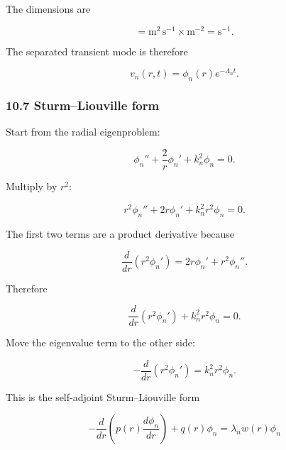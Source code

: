\documentclass[11pt,a4paper]{article}
\begin{document}
The dimensions are

\begin{equation}
[\Lambda_n]
=
\mathrm{m^2\,s^{-1}}
\times
\mathrm{m^{-2}}
=
\mathrm{s^{-1}}.
\tag{TRISO-ANA-306}
\label{eq:triso-ana-306}
\end{equation}

The separated transient mode is therefore

\begin{equation}
v_n(r,t)=\phi_n(r)e^{-\Lambda_nt}.
\tag{TRISO-ANA-307}
\label{eq:triso-ana-307}
\end{equation}

\subsubsection*{10.7 Sturm–Liouville form}

Start from the radial eigenproblem:

\begin{equation}
\phi_n''
+
\frac2r\phi_n'
+
k_n^2\phi_n
=
0.
\tag{TRISO-SL-200}
\label{eq:triso-sl-200}
\end{equation}

Multiply by $r^2$:

\begin{equation}
r^2\phi_n''
+
2r\phi_n'
+
k_n^2r^2\phi_n
=
0.
\tag{TRISO-SL-201}
\label{eq:triso-sl-201}
\end{equation}

The first two terms are a product derivative because

\begin{equation}
\frac{d}{dr}(r^2\phi_n')
=
2r\phi_n'
+
r^2\phi_n''.
\tag{TRISO-SL-202}
\label{eq:triso-sl-202}
\end{equation}

Therefore

\begin{equation}
\frac{d}{dr}(r^2\phi_n')
+
k_n^2r^2\phi_n
=
0.
\tag{TRISO-SL-203}
\label{eq:triso-sl-203}
\end{equation}

Move the eigenvalue term to the other side:

\begin{equation}
-\frac{d}{dr}(r^2\phi_n')
=
k_n^2r^2\phi_n.
\tag{TRISO-SL-204}
\label{eq:triso-sl-204}
\end{equation}

This is the self-adjoint Sturm–Liouville form

\begin{equation}
-\frac{d}{dr}
\left(
p(r)\frac{d\phi_n}{dr}
\right)
+
q(r)\phi_n
=
\lambda_n w(r)\phi_n
\end{equation}
\end{document}
